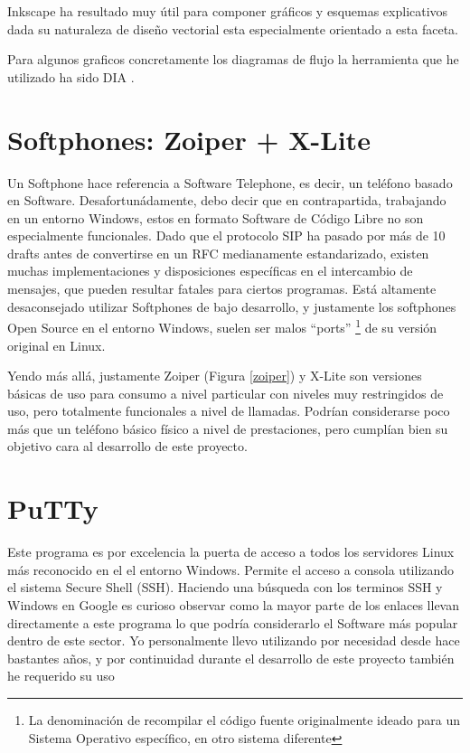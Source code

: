 Inkscape \cite{website:inkscape} ha resultado muy útil para componer gráficos y esquemas explicativos dada su naturaleza de diseño vectorial esta especialmente orientado a esta faceta.

Para algunos graficos concretamente los diagramas de flujo la herramienta que he utilizado ha sido DIA \cite{website:dia}.


\section*{Softphones: Zoiper + X-Lite}

Un Softphone hace referencia a Software Telephone, es decir, un teléfono basado en Software. Desafortunádamente, debo decir que en contrapartida, trabajando en un entorno Windows, estos en formato Software de Código Libre no son especialmente funcionales. Dado que el protocolo SIP ha pasado por más de 10 drafts antes de convertirse en un RFC medianamente estandarizado, existen muchas implementaciones y disposiciones específicas en el intercambio de mensajes, que pueden resultar fatales para ciertos programas. Está altamente desaconsejado utilizar Softphones de bajo desarrollo, y justamente los softphones Open Source en el entorno Windows, suelen ser malos ``ports'' \footnote{La denominación de recompilar el código fuente originalmente ideado para un Sistema Operativo específico, en otro sistema diferente} de su versión original en Linux.

Yendo más allá, justamente Zoiper \cite{website:zoiper} (Figura \ref{zoiper}) y X-Lite \cite{website:xlite} son versiones básicas de uso para consumo a nivel particular con niveles muy restringidos de uso, pero totalmente funcionales a nivel de llamadas. Podrían considerarse poco más que un teléfono básico físico a nivel de prestaciones, pero cumplían bien su objetivo cara al desarrollo de este proyecto.


\section*{PuTTy}

Este programa es por excelencia la puerta de acceso a todos los servidores Linux más reconocido en el el entorno Windows. Permite el acceso a consola utilizando el sistema Secure Shell (SSH). Haciendo una búsqueda con los terminos SSH y Windows en Google es curioso observar como la mayor parte de los enlaces llevan directamente a este programa lo que podría considerarlo el Software más popular dentro de este sector. Yo personalmente llevo utilizando por necesidad desde hace bastantes años, y por continuidad durante el desarrollo de este proyecto también he requerido su uso

